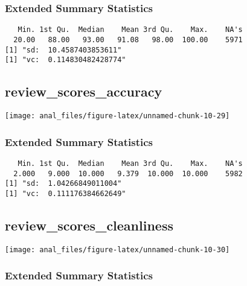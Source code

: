 \hypertarget{extended-summary-statistics-14}{%
\subsubsection{Extended Summary
Statistics}\label{extended-summary-statistics-14}}

\begin{verbatim}   Min. 1st Qu.  Median    Mean 3rd Qu.    Max.    NA's 
  20.00   88.00   93.00   91.08   98.00  100.00    5971 
[1] "sd:  10.4587403853611"
[1] "vc:  0.114830482428774"
\end{verbatim}

\pagebreak

\hypertarget{review_scores_accuracy}{%
\subsection{review\_scores\_accuracy}\label{review_scores_accuracy}}

\begin{center}\texttt{[image: anal\_files/figure-latex/unnamed-chunk-10-29]} \end{center}

\hypertarget{extended-summary-statistics-15}{%
\subsubsection{Extended Summary
Statistics}\label{extended-summary-statistics-15}}

\begin{verbatim}   Min. 1st Qu.  Median    Mean 3rd Qu.    Max.    NA's 
  2.000   9.000  10.000   9.379  10.000  10.000    5982 
[1] "sd:  1.04266849011004"
[1] "vc:  0.111176384662649"
\end{verbatim}

\pagebreak

\hypertarget{review_scores_cleanliness}{%
\subsection{review\_scores\_cleanliness}\label{review_scores_cleanliness}}

\begin{center}\texttt{[image: anal\_files/figure-latex/unnamed-chunk-10-30]} \end{center}

\hypertarget{extended-summary-statistics-16}{%
\subsubsection{Extended Summary
Statistics}\label{extended-summary-statistics-16}}

